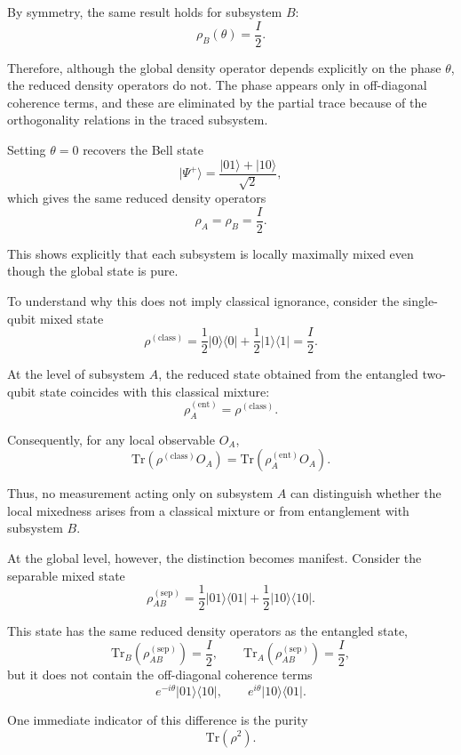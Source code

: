 \documentclass[a4paper]{article}
\begin{document}
By symmetry, the same result holds for subsystem $B$:
\[
\rho_B(\theta) = \frac{I}{2}.
\]

Therefore, although the global density operator depends explicitly on the phase $\theta$, the reduced density operators do not. The phase appears only in off-diagonal coherence terms, and these are eliminated by the partial trace because of the orthogonality relations in the traced subsystem.

\medskip

Setting $\theta = 0$ recovers the Bell state
\[
|\Psi^+\rangle = \frac{|01\rangle + |10\rangle}{\sqrt{2}},
\]
which gives the same reduced density operators
\[
\rho_A = \rho_B = \frac{I}{2}.
\]

This shows explicitly that each subsystem is locally maximally mixed even though the global state is pure.

\medskip

To understand why this does not imply classical ignorance, consider the single-qubit mixed state
\[
\rho^{(\mathrm{class})}
=
\frac{1}{2}|0\rangle\langle 0|
+
\frac{1}{2}|1\rangle\langle 1|
=
\frac{I}{2}.
\]

At the level of subsystem $A$, the reduced state obtained from the entangled two-qubit state coincides with this classical mixture:
\[
\rho_A^{(\mathrm{ent})} = \rho^{(\mathrm{class})}.
\]

Consequently, for any local observable $O_A$,
\[
\mathrm{Tr}(\rho^{(\mathrm{class})} O_A)
=
\mathrm{Tr}(\rho_A^{(\mathrm{ent})} O_A).
\]

Thus, no measurement acting only on subsystem $A$ can distinguish whether the local mixedness arises from a classical mixture or from entanglement with subsystem $B$.

\medskip

At the global level, however, the distinction becomes manifest. Consider the separable mixed state
\[
\rho_{AB}^{(\mathrm{sep})}
=
\frac{1}{2}|01\rangle\langle 01|
+
\frac{1}{2}|10\rangle\langle 10|.
\]

This state has the same reduced density operators as the entangled state,
\[
\mathrm{Tr}_B(\rho_{AB}^{(\mathrm{sep})}) = \frac{I}{2},
\qquad
\mathrm{Tr}_A(\rho_{AB}^{(\mathrm{sep})}) = \frac{I}{2},
\]
but it does not contain the off-diagonal coherence terms
\[
e^{-i\theta}|01\rangle\langle 10|,
\qquad
e^{i\theta}|10\rangle\langle 01|.
\]

One immediate indicator of this difference is the purity
\[
\mathrm{Tr}(\rho^2).
\]
\end{document}
